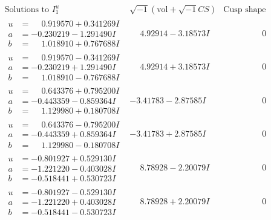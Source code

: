 \documentclass[1p]{elsarticle_modified}
\theoremstyle{definition}
\newcommand{\I}{\sqrt{-1}}
\begin{document}
$$\begin{array}{c|c|c}  
\text{Solutions to }I^u_{1}& \I (\text{vol} + \sqrt{-1}CS) & \text{Cusp shape}\\
 \hline 
\begin{aligned}
u &= \phantom{-}0.919570 + 0.341269 I \\
a &= -0.230219 - 1.291490 I \\
b &= \phantom{-}1.018910 + 0.767688 I\end{aligned}
 & \phantom{-}4.92914 - 3.18573 I & \phantom{-0.000000 } 0 \\ \hline\begin{aligned}
u &= \phantom{-}0.919570 - 0.341269 I \\
a &= -0.230219 + 1.291490 I \\
b &= \phantom{-}1.018910 - 0.767688 I\end{aligned}
 & \phantom{-}4.92914 + 3.18573 I & \phantom{-0.000000 } 0 \\ \hline\begin{aligned}
u &= \phantom{-}0.643376 + 0.795200 I \\
a &= -0.443359 - 0.859364 I \\
b &= \phantom{-}1.129980 + 0.180708 I\end{aligned}
 & -3.41783 - 2.87585 I & \phantom{-0.000000 } 0 \\ \hline\begin{aligned}
u &= \phantom{-}0.643376 - 0.795200 I \\
a &= -0.443359 + 0.859364 I \\
b &= \phantom{-}1.129980 - 0.180708 I\end{aligned}
 & -3.41783 + 2.87585 I & \phantom{-0.000000 } 0 \\ \hline\begin{aligned}
u &= -0.801927 + 0.529130 I \\
a &= -1.221220 - 0.403028 I \\
b &= -0.518441 + 0.530723 I\end{aligned}
 & \phantom{-}8.78928 - 2.20079 I & \phantom{-0.000000 } 0 \\ \hline\begin{aligned}
u &= -0.801927 - 0.529130 I \\
a &= -1.221220 + 0.403028 I \\
b &= -0.518441 - 0.530723 I\end{aligned}
 & \phantom{-}8.78928 + 2.20079 I & \phantom{-0.000000 } 0 \\ \hline\begin{aligned}

\end{aligned}
\end{array}$$
\end{document}
